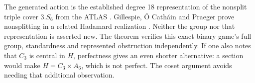 \begin{remark}\label{remark:07-six-player-2}
The generated action is the established degree 18 representation of the
nonsplit triple cover $3.S_6$ from the ATLAS \citep{atlas}. Gillespie,
\'O Cath\'ain and Praeger prove nonsplitting in a related Hadamard realization
\citep{gillespie2018}. Neither the group nor that representation is asserted
new. The theorem verifies this exact binary game's full group, standardness
and represented obstruction independently. If one also notes that $C_3$ is
central in $H$, perfectness gives an even shorter alternative: a section would
make $H=C_3\times A_6$, which is not perfect. The coset argument avoids needing
that additional observation.
\end{remark}
